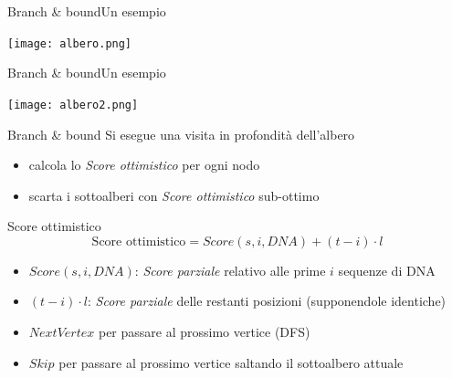 	\begin{frame}{Branch \& bound}{Un esempio}
		\begin{center}
			\texttt{[image: albero.png]}
		\end{center}
	\end{frame}
	
	\begin{frame}{Branch \& bound}{Un esempio}
		\begin{center}
			\texttt{[image: albero2.png]}
		\end{center}
	\end{frame}
	
	\begin{frame}{Branch \& bound}
		Si esegue una visita in profondità dell'albero
		\pause
		\begin{itemize}
			\item calcola lo \textit{Score ottimistico} per ogni nodo
			\pause
			\item scarta i sottoalberi con \textit{Score ottimistico} sub-ottimo
		\end{itemize}
		\pause
		\begin{block}{Score ottimistico}
			$$\mbox{Score ottimistico}=Score(s,i,DNA)+(t-i)\cdot l$$
			\begin{itemize}
				\item $Score(s,i,DNA)$: \textit{Score parziale} relativo alle prime $i$ sequenze di DNA
				\item $(t-i)\cdot l$: \textit{Score parziale} delle restanti posizioni (supponendole identiche)
			\end{itemize}
		\end{block}
		\pause
		\begin{itemize}
			\item $NextVertex$ per passare al prossimo vertice (DFS)
			\item $Skip$ per passare al prossimo vertice saltando il sottoalbero attuale
		\end{itemize}
	\end{frame}
	
